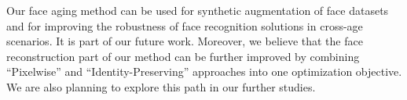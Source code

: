 \documentclass{article}
\begin{document}
Our face aging method can be used for synthetic augmentation of face datasets and for improving the robustness of face recognition solutions in cross-age scenarios.
It is part of our future work.
Moreover, we believe that the face reconstruction part of our method can be further improved by combining ``Pixelwise'' and ``Identity-Preserving'' approaches into one optimization objective.
We are also planning to explore this path in our further studies.



\end{document}
